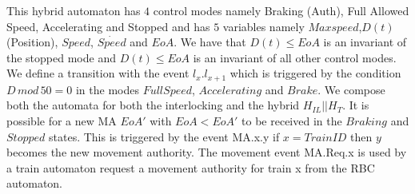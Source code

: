 This hybrid automaton has $4$ control modes namely Braking (Auth), Full Allowed Speed, Accelerating and Stopped and has $5$ variables namely $Maxspeed$,$D(t)$ (Position),  $Speed$, $\dot{Speed}$ and $EoA$. We have that $D(t) \leq EoA$ is an invariant of the stopped mode and $D(t) \leq EoA$ is an invariant of all other control modes.
We define a transition with the event $l_x.l_{x+1}$ which is triggered by the condition $D \,  mod \, 50 = 0$ in the modes $Full Speed$, $Accelerating$ and $Brake$. 
   We compose both the automata for both the interlocking and the hybrid $H_{IL} || H_{T}$. It is possible for a new MA $EoA'$ with $EoA < EoA'$ to be received in the $Braking$ and $Stopped$ states.  This is triggered by the event MA.x.y if $x = TrainID$ then $y$ becomes the new movement authority. The movement event MA.Req.x is used by a train automaton request a movement authority for train x from the RBC automaton.



